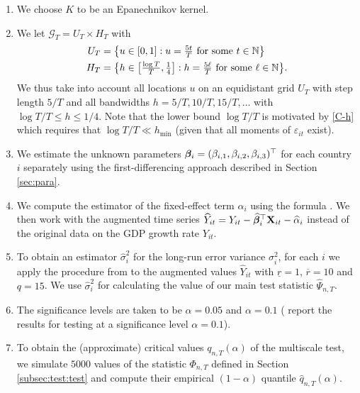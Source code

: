 \documentclass[a4paper,12pt]{article}
\makeatletter
\renewcommand{\eqref}[1]{\tagform@{\ref{#1}}}
\makeatother
\begin{document}
{\begin{enumerate}
\item We choose $K$ to be an Epanechnikov kernel.
\item We let $\mathcal{G}_T = U_T \times H_T$ with 
\begin{align*}
U_T & = \big\{ u \in [0,1]: u = \textstyle{\frac{5t}{T}} \text{ for some } t \in \mathbb{N} \big\} \\
H_T & = \big\{ h \in \big[ \textstyle{\frac{\log T}{T}}, \textstyle{\frac{1}{4}} \big]:  h = \textstyle{\frac{5\ell}{T}} \text{ for some } \ell \in \mathbb{N} \big\}. 
\end{align*}
We thus take into account all locations $u$ on an equidistant grid $U_T$ with step length $5/T$ and all bandwidths $h=5/T, 10/T, 15/T,\ldots$ with $\log T /T \le h \le 1/4$. Note that the lower bound $\log T / T$ is motivated by \ref{C-h} which requires that $\log T /T \ll h_{\min}$ (given that all moments of $\varepsilon_{it}$ exist).
\item We estimate the unknown parameters $\bm{\beta}_i = (\beta_{i, 1}, \beta_{i, 2}, \beta_{i, 3})^\top$ for each country $i$ separately using the first-differencing approach described in Section \ref{sec:para}.
\item We compute the estimator of the fixed-effect term $\alpha_i$ using the formula \eqref{eq:alpha:est}. We then work with the augmented time series $\widehat{Y}_{it} = Y_{it} - \widehat{\bm{\beta}}_i^\top \mathbf{X}_{it} - \widehat{\alpha}_{i}$ instead of the original data on the GDP growth rate $Y_{it}$.
\item To obtain an estimator $\hat{\sigma}_i^2$ for the long-run error variance $\sigma^2_i$, for each $i$ we apply the procedure from \cite{KhismatullinaVogt2020} to the augmented values $\widehat{Y}_{it}$ with $\underline{r}=1$, $\overline{r}=10$ and $q = 15$. We use $\hat{\sigma}^2_i$ for calculating the value of our main test statistic $\widehat{\Psi}_{n, T}$. %
\item The significance levels are taken to be $\alpha = 0.05$ and $\alpha = 0.1$ (\citet{Zhang2012} report the results for testing at a significance level $\alpha = 0.1$).
\item To obtain the (approximate) critical values $q_{n, T}(\alpha)$ of the multiscale test, we simulate $5000$ values of the statistic $\Phi_{n, T}$ defined in Section \ref{subsec:test:test} and compute their empirical $(1-\alpha)$ quantile $\hat{q}_{n, T}(\alpha)$.
\end{enumerate}

}
\end{document}
